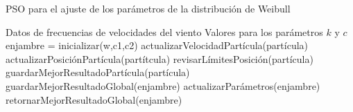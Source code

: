\begin{algorithm}[h!]
\caption{PSO para el ajuste de los parámetros de la distribución de Weibull}
\label{alg:pso}
\begin{algorithmic}
\REQUIRE Datos de frecuencias de velocidades del viento
\ENSURE Valores para los parámetros $k$ y $c$
\STATE enjambre = inicializar(w,c1,c2)
    \STATE actualizarVelocidadPartícula(partícula)
    \STATE actualizarPosiciónPartícula(partítcula)
    \STATE revisarLímitesPosición(partícula)
    \STATE guardarMejorResultadoPartícula(partícula)
\ENDFOR
\STATE guardarMejorResultadoGlobal(enjambre)
\STATE actualizarParámetros(enjambre)
\ENDFOR
\STATE retornarMejorResultadoGlobal(enjambre)
\end{algorithmic}
\end{algorithm}
